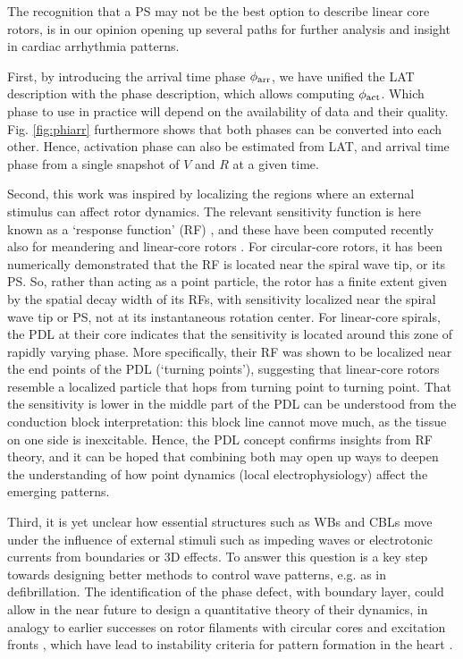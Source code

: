 \documentclass{article}
\newcommand{\phiact}{\ensuremath{\phi_{\rm act}}}
\newcommand{\phiarr}{\ensuremath{\phi_{\rm arr}}}
\begin{document}
The recognition that a PS may not be the best option to describe linear core rotors, is in our opinion opening up several paths for further analysis and insight in cardiac arrhythmia patterns. 

First, by introducing the arrival time phase $\phiarr$, we have unified the LAT description with the phase description, which allows computing $\phiact$. Which phase to use in practice will depend on the availability of data and their quality. Fig. \ref{fig:phiarr} furthermore shows that both phases can be converted into each other. Hence, activation phase can also be estimated from LAT, and arrival time phase from a single snapshot of $V$ and $R$ at a given time.  

Second, this work was inspired by localizing the regions where an external stimulus can affect rotor dynamics. The relevant sensitivity function is here known as a `response function' (RF) \citep{Biktasheva:2003}, and these have been computed recently also for meandering and linear-core rotors \citep{Marcotte:2015, Dierckx:2017}. 
For circular-core rotors, it has been numerically demonstrated that the RF is located near the spiral wave tip, or its PS. So, rather than acting as a point particle, the rotor has a finite extent given by the spatial decay width of its RFs, with sensitivity localized near the spiral wave tip or PS, not at its instantaneous rotation center. 
For linear-core spirals, the PDL at their core indicates that the sensitivity is located around this zone of rapidly varying phase. More specifically, their RF was shown to be localized near the end points of the PDL \citep{Dierckx:2017} (`turning points'), suggesting that linear-core rotors resemble a localized particle that hops from turning point to turning point. That the sensitivity is lower in the middle part of the PDL can be understood from the conduction block interpretation: this block line cannot move much, as the tissue on one side is inexcitable. Hence, the PDL concept confirms insights from RF theory, and it can be hoped that combining both may open up ways to deepen the understanding of how point dynamics (local electrophysiology) affect the emerging patterns. 

Third, it is yet unclear how essential structures such as WBs and CBLs move under the influence of external stimuli such as impeding waves or electrotonic currents from boundaries or 3D effects. To answer this question is a key step towards designing better methods to control wave patterns, e.g. as in defibrillation. The identification of the phase defect, with boundary layer, could allow in the near future to design a quantitative theory of their dynamics, in analogy to earlier successes on rotor filaments with circular cores \citep{Keener:1988} and excitation fronts \citep{Kuramoto:1980}, which have lead to instability criteria for pattern formation in the heart \citep{Biktashev:1994, Dierckx:2012}. 
\end{document}
